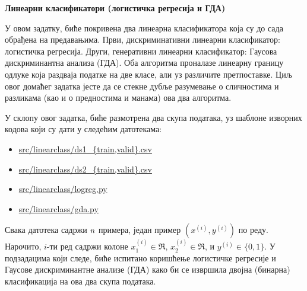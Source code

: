 \item {} {\bf Линеарни класификатори (логистичка регресија и ГДА)}

У овом задатку, биће покривена два линеарна класификатора која су до сада обрађена на предавањима. Први, дискриминативни линеарни класификатор: логистичка регресија. Други, генеративни линеарни класификатор: Гаусова дискриминантна анализа (ГДА). Оба алгоритма проналазе линеарну границу одлуке која раздваја податке на две класе, али уз различите претпоставке. Циљ овог домаћег задатка јесте да се стекне дубље разумевање о сличностима и разликама (као и о предностима и манама) ова два алгоритма.

У склопу овог задатка, биће размотрена два скупа података, уз шаблоне изворних кодова који су дати у следећим датотекама:
\begin{center}
\begin{itemize} %
\item \url{src/linearclass/ds1_{train,valid}.csv}
\item \url{src/linearclass/ds2_{train,valid}.csv}
\item \url{src/linearclass/logreg.py}
\item \url{src/linearclass/gda.py}
\end{itemize}
\end{center}
Свака датотека садржи ${n}$ примера, један пример $(x^{(i)}, y^{(i)})$ по реду. Нарочито, $i$-ти ред садржи колоне $x^{(i)}_1\in\Re$,
$x^{(i)}_2\in\Re$, и $y^{(i)}\in\{0, 1\}$. У подзадацима који следе, биће испитано коришћење логистичке регресије и Гаусове дискриминантне анализе (ГДА) како би се извршила двојна (бинарна) класификација на ова два скупа података.

\begin{enumerate}
	
        \ifnum{} {
            
        } \fi

	
        \ifnum{} {
            
        } \fi


	
        \ifnum{} {
            
        }\fi

	
        \ifnum{} {
            
        } \fi

	
        \ifnum{} {
            
        } \fi

	
        \ifnum{} {
            
        } \fi

	
        \ifnum{}\fi

	
        \ifnum{}\fi

\end{enumerate}
